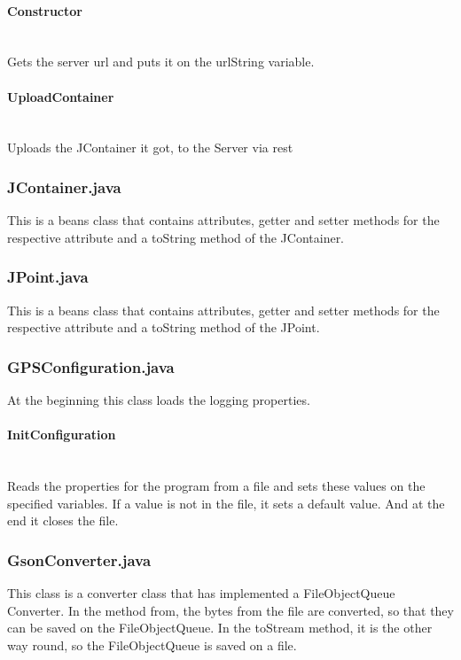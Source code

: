 \paragraph{Constructor}\mbox{}\\
Gets the server \gls{url} and puts it on the urlString variable.
\paragraph{UploadContainer}\mbox{}\\
Uploads the JContainer it got, to the Server via \gls{rest} 
\subsubsection{JContainer.java}
This is a beans class that contains attributes, getter and setter methods for the respective attribute and a toString method of the JContainer.
\subsubsection{JPoint.java}
This is a beans class that contains attributes, getter and setter methods for the respective attribute and a toString method of the JPoint.
\subsubsection{GPSConfiguration.java}
At the beginning this class loads the logging properties.
\paragraph{InitConfiguration}\mbox{}\\
Reads the properties for the program from a file and sets these values on the specified variables. If a value is not in the file, it sets a default value. And at the end it closes the file.
\subsubsection{GsonConverter.java}
This class is a converter class that has implemented a FileObjectQueue Converter. In the method from, the bytes from the file are converted, so that they can be saved on the FileObjectQueue. In the toStream method, it is the other way round, so the FileObjectQueue is saved on a file.
